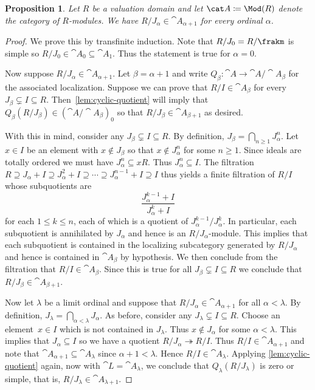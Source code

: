 \documentclass{amsart}
\numberwithin{equation}{section}%
\newtheorem{Prop}[equation]{Proposition}
\theoremstyle{remark}
\begin{document}
\begin{Prop}\label{prop:jacobson-gabriel}
	Let $R$ be a valuation domain and let $\cat A\coloneqq\Mod(R)$ denote the category of $R$-modules. We have $R/J_\alpha \in \cat A_{\alpha + 1}$ for every ordinal $\alpha$.
\end{Prop}

\begin{proof}
	We prove this by transfinite induction. Note that $R/J_0 = R/\frakm$ is simple so $R/J_0 \in \cat A_0 \subseteq \cat A_1$. Thus the statement is true for $\alpha=0$.

	Now suppose $R/J_\alpha \in \cat A_{\alpha+1}$. Let $\beta = \alpha + 1$ and write $Q_\beta\colon \cat A \to \cat A/\cat A_\beta$ for the associated localization. Suppose we can prove that $R/I \in \cat A_\beta$ for every $J_\beta \subsetneq I \subseteq R$. Then~\cref{lem:cyclic-quotient} will imply that $Q_\beta(R/J_\beta) \in (\cat A/\cat A_\beta)_0$ so that $R/J_\beta \in \cat A_{\beta +1}$ as desired.

	With this in mind, consider any $J_\beta \subsetneq I \subseteq R$. By definition, $J_\beta = \bigcap_{n \ge 1} J_\alpha^n$. Let $x \in I$ be an element with $x \not\in J_\beta$ so that $x \not\in J_\alpha^n$ for some $n \ge 1$. Since ideals are totally ordered we must have $J_\alpha^n \subseteq xR$. Thus $J_\alpha^n \subseteq I$. The filtration $R \supseteq J_\alpha + I \supseteq J_\alpha^2 + I \supseteq \cdots\supseteq J_\alpha^{n-1} + I \supseteq I$ thus yields a finite filtration of $R/I$ whose subquotients are
	\[
		\frac{J_\alpha^{k-1} + I}{J_\alpha^{k}+I}
	\]
	for each $1 \le k \le n$, each of which is a quotient of $J_\alpha^{k-1}/J_\alpha^k$. In particular, each subquotient is annihilated by $J_\alpha$ and hence is an $R/J_\alpha$-module. This implies that each subquotient is contained in the localizing subcategory generated by $R/J_\alpha$ and hence is contained in $\cat A_{\beta}$ by hypothesis. We then conclude from the filtration that $R/I \in \cat A_{\beta}$. Since this is true for all $J_\beta \subsetneq I \subseteq R$ we conclude that $R/J_\beta \in \cat A_{\beta + 1}$.

	Now let $\lambda$ be a limit ordinal and suppose that $R/J_\alpha \in \cat A_{\alpha+1}$ for all $\alpha < \lambda$. By definition, $J_\lambda = \bigcap_{\alpha < \lambda} J_\alpha$. As before, consider any $J_\lambda \subsetneq I \subseteq R$. Choose an element~$x\in I$ which is not contained in $J_\lambda$. Thus $x \not\in J_\alpha$ for some $\alpha < \lambda$. This implies that $J_\alpha \subseteq I$ so we have a quotient $R/J_\alpha \twoheadrightarrow R/I$. Thus $R/I \in \cat A_{\alpha + 1}$ and note that $\cat A_{\alpha + 1} \subseteq \cat A_\lambda$ since $\alpha+1<\lambda$. Hence $R/I \in \cat A_\lambda$. Applying \cref{lem:cyclic-quotient} again, now with $\cat L = \cat A_\lambda$, we conclude that $Q_\lambda(R/J_\lambda)$ is zero or simple, that is, $R/J_\lambda \in \cat A_{\lambda+1}$.
\end{proof}
\end{document}
